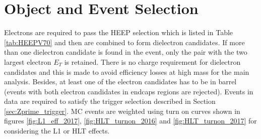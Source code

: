 \section{Object and Event Selection}\label{sec:Zprime_HEEP}
Electrons are required to pass the HEEP selection which is listed in Table \ref{tab:HEEPV70} and then are combined to form dielectron candidates.
If more than one dielectron candidate is found in the event, only the pair with the two largest electron $E_T$ is retained.
There is no charge requirement for dielectron candidates and this is made to avoid efficiency losses at high mass for the main analysis.
Besides, at least one of the electron candidates has to be in barrel (events with both electron candidates in endcaps regions are rejected).
Events in data are required to satisfy the trigger selection described in Section \ref{sec:Zprime_trigger}.
MC events are weighted using turn on curves shown in figures \ref{fig:L1_eff_2017}, \ref{fig:HLT_turnon_2016} and \ref{fig:HLT_turnon_2017} for considering the L1 or HLT effects.



